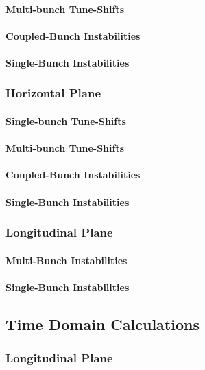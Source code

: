 \documentclass[
	12pt,				%
	openright,			%
	oneside,			%
	a4paper,		%
	chapter=TITLE,		%
	section=TITLE,		%
    brazil,				%
	english,			%
	sumario=tradicional,
	]{abntex2}
\begin{document}
        \paragraph{Multi-bunch Tune-Shifts}
        \paragraph{Coupled-Bunch Instabilities}
        \paragraph{Single-Bunch Instabilities}
      \subsubsection{Horizontal Plane}
        \paragraph{Single-bunch Tune-Shifts}
        \paragraph{Multi-bunch Tune-Shifts}
        \paragraph{Coupled-Bunch Instabilities}
        \paragraph{Single-Bunch Instabilities}
      \subsubsection{Longitudinal Plane}
        \paragraph{Multi-Bunch Instabilities}
        \paragraph{Single-Bunch Instabilities}
    \subsection{Time Domain Calculations}
      \subsubsection{Longitudinal Plane}
\end{document}
